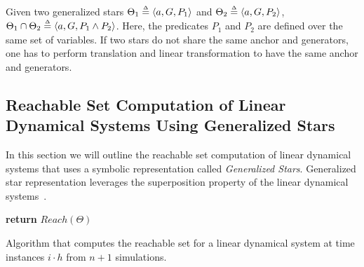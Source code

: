 
Given two generalized stars $\Theta_1 \deq \tup{a, G, P_1}$ and $\Theta_2 \deq \tup{a, G, P_2}$, $\Theta_1 \cap \Theta_2 \deq \tup{a, G, P_1 \wedge P_2}$. 
%
Here, the predicates $P_1$ and $P_2$ are defined over the same set of variables. 
%
If two stars do not share the same anchor and generators, one has to perform translation and linear transformation to have the same anchor and generators. 


\subsection{Reachable Set Computation of Linear Dynamical Systems Using Generalized Stars}
\label{sec:reachStars}

In this section we will outline the reachable set computation of linear dynamical systems that uses a symbolic representation called \emph{Generalized Stars}.
%
Generalized star representation leverages the superposition property of the linear dynamical systems~\cite{duggirala2016parsimonious}.
%

\begin{algorithm}[h]
\SetAlgoVlined
{}
{\bf return} $Reach(\Theta)$\;
\caption{Algorithm that computes the reachable set for a linear dynamical system at time instances $i \cdot h$ from $n+1$ simulations.}
\label{alg:algoFullInfo}
\end{algorithm}

